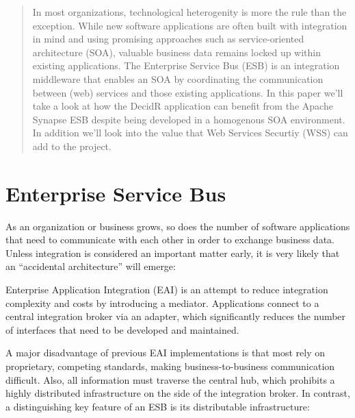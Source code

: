 \begin{abstract}
In most organizations, technological heterogenity is more the rule than the
exception. While new software applications are often built with integration in
mind and using promising approaches such as service-oriented architecture (SOA), valuable
business data remains locked up within existing applications. The Enterprise
Service Bus (ESB) is an integration middleware that enables an SOA by
coordinating the communication between (web) services and those existing
applications. In this paper we'll take a look at how the DecidR application can
benefit from the Apache Synapse ESB despite being developed in a
homogenous SOA environment. In addition we'll look into the value that Web
Services Securtiy (WSS) can add to the project.
\end{abstract}

\section{Enterprise Service Bus}
\label{chap:enterprise-service-bus}
As an organization or business grows, so does the number of software applications
that need to communicate with each other in order to exchange business data.
Unless integration is considered an important matter early, it is very likely
that an ``accidental architecture'' will emerge:


Enterprise Application Integration (EAI) is an attempt to reduce integration
complexity and costs by introducing a mediator. Applications connect to a central
integration broker via an adapter, which significantly reduces the
number of interfaces that need to be developed and maintained.


A major disadvantage of previous EAI implementations is that most rely on
proprietary, competing standards, making business-to-business communication
difficult. Also, all information must traverse the central hub, which prohibits
a highly distributed infrastructure on the side of the integration broker.
In contrast, a distinguishing key feature of an ESB is its
distributable infrastructure:


